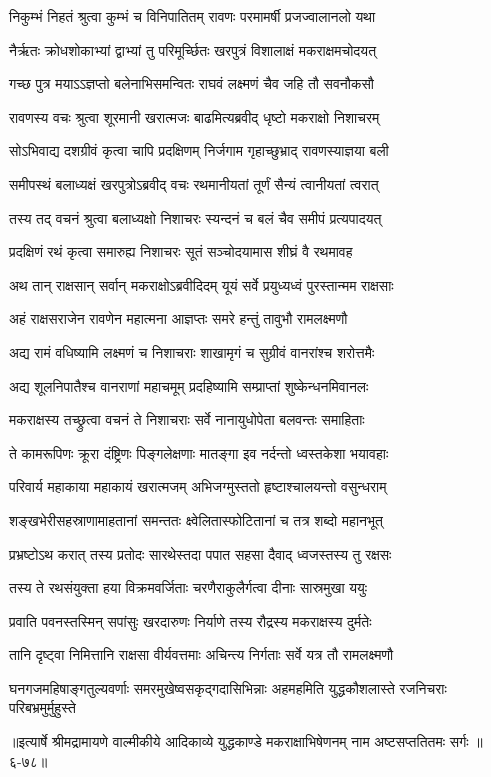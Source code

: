 
\twolineshloka
{निकुम्भं निहतं श्रुत्वा कुम्भं च विनिपातितम्}
{रावणः परमामर्षी प्रजज्वालानलो यथा} %

\twolineshloka
{नैर्ऋतः क्रोधशोकाभ्यां द्वाभ्यां तु परिमूर्च्छितः}
{खरपुत्रं विशालाक्षं मकराक्षमचोदयत्} %

\twolineshloka
{गच्छ पुत्र मयाऽऽज्ञप्तो बलेनाभिसमन्वितः}
{राघवं लक्ष्मणं चैव जहि तौ सवनौकसौ} %

\twolineshloka
{रावणस्य वचः श्रुत्वा शूरमानी खरात्मजः}
{बाढमित्यब्रवीद् धृष्टो मकराक्षो निशाचरम्} %

\twolineshloka
{सोऽभिवाद्य दशग्रीवं कृत्वा चापि प्रदक्षिणम्}
{निर्जगाम गृहाच्छुभ्राद् रावणस्याज्ञया बली} %

\twolineshloka
{समीपस्थं बलाध्यक्षं खरपुत्रोऽब्रवीद् वचः}
{रथमानीयतां तूर्णं सैन्यं त्वानीयतां त्वरात्} %

\twolineshloka
{तस्य तद् वचनं श्रुत्वा बलाध्यक्षो निशाचरः}
{स्यन्दनं च बलं चैव समीपं प्रत्यपादयत्} %

\twolineshloka
{प्रदक्षिणं रथं कृत्वा समारुह्य निशाचरः}
{सूतं सञ्चोदयामास शीघ्रं वै रथमावह} %

\twolineshloka
{अथ तान् राक्षसान् सर्वान् मकराक्षोऽब्रवीदिदम्}
{यूयं सर्वे प्रयुध्यध्वं पुरस्तान्मम राक्षसाः} %

\twolineshloka
{अहं राक्षसराजेन रावणेन महात्मना}
{आज्ञप्तः समरे हन्तुं तावुभौ रामलक्ष्मणौ} %

\twolineshloka
{अद्य रामं वधिष्यामि लक्ष्मणं च निशाचराः}
{शाखामृगं च सुग्रीवं वानरांश्च शरोत्तमैः} %

\twolineshloka
{अद्य शूलनिपातैश्च वानराणां महाचमूम्}
{प्रदहिष्यामि सम्प्राप्तां शुष्केन्धनमिवानलः} %

\twolineshloka
{मकराक्षस्य तच्छ्रुत्वा वचनं ते निशाचराः}
{सर्वे नानायुधोपेता बलवन्तः समाहिताः} %

\twolineshloka
{ते कामरूपिणः क्रूरा दंष्ट्रिणः पिङ्गलेक्षणाः}
{मातङ्गा इव नर्दन्तो ध्वस्तकेशा भयावहाः} %

\twolineshloka
{परिवार्य महाकाया महाकायं खरात्मजम्}
{अभिजग्मुस्ततो हृष्टाश्चालयन्तो वसुन्धराम्} %

\twolineshloka
{शङ्खभेरीसहस्राणामाहतानां समन्ततः}
{क्ष्वेलितास्फोटितानां च तत्र शब्दो महानभूत्} %

\twolineshloka
{प्रभ्रष्टोऽथ करात् तस्य प्रतोदः सारथेस्तदा}
{पपात सहसा दैवाद् ध्वजस्तस्य तु रक्षसः} %

\twolineshloka
{तस्य ते रथसंयुक्ता हया विक्रमवर्जिताः}
{चरणैराकुलैर्गत्वा दीनाः सास्रमुखा ययुः} %

\twolineshloka
{प्रवाति पवनस्तस्मिन् सपांसुः खरदारुणः}
{निर्याणे तस्य रौद्रस्य मकराक्षस्य दुर्मतेः} %

\twolineshloka
{तानि दृष्ट्वा निमित्तानि राक्षसा वीर्यवत्तमाः}
{अचिन्त्य निर्गताः सर्वे यत्र तौ रामलक्ष्मणौ} %

\twolineshloka
{घनगजमहिषाङ्गतुल्यवर्णाः समरमुखेष्वसकृद्गदासिभिन्नाः}
{अहमहमिति युद्धकौशलास्ते रजनिचराः परिबभ्रमुर्मुहुस्ते} %


॥इत्यार्षे श्रीमद्रामायणे वाल्मीकीये आदिकाव्ये युद्धकाण्डे मकराक्षाभिषेणनम् नाम अष्टसप्ततितमः सर्गः ॥६-७८॥
